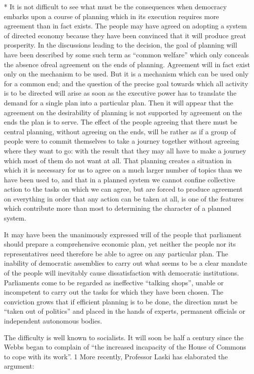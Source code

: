 \documentclass[11pt,openany]{book}
\begin{document}
* It is not difficult to see what must be the consequences when democracy embarks upon a course of planning which in its execution requires more agreement than in fact exists. The people may have agreed on adopting a system of directed economy because they have been convinced that it will produce great prosperity. In the discussions leading to the decision, the goal of planning will have been described by some such term as ``common welfare'' which only conceals the absence ofreal agreement on the ends of planning. Agreement will in fact exist only on the mechanism to be used. But it is a mechanism which can be used only for a common end; and the question of the precise goal towards which all activity is to be directed will arise as soon as the executive power has to translate the demand for a single plan into a particular plan. Then it will appear that the agreement on the desirability of planning is not supported by agreement on the ends the plan is to serve. The effect of the people agreeing that there must be central planning, without agreeing on the ends, will be rather as if a group of people were to commit themselves to take a journey together without agreeing where they want to go: with the result that they may all have to make a journey which most of them do not want at all. That planning creates a situation in which it is necessary for us to agree on a much larger number of topics than we have been used to, and that in a planned system we cannot confine collective action to the tasks on which we can agree, but are forced to produce agreement on everything in order that any action can be taken at all, is one of the features which contribute more than most to determining the character of a planned system.

It may have been the unanimously expressed will of the people that parliament should prepare a comprehensive economic plan, yet neither the people nor its representatives need therefore be able to agree on any particular plan. The inability of democratic assemblies to carry out what seems to be a clear mandate of the people will inevitably cause dissatisfaction with democratic institutions. Parliaments come to be regarded as ineffective ``talking shops'', unable or incompetent to carry out the tasks for which they have been chosen. The conviction grows that if efficient planning is to be done, the direction must be ``taken out of politics'' and placed in the hands of experts, permanent officials or independent autonomous bodies.

The difficulty is well known to socialists. It will soon be half a century since the Webbs began to complain of ``the increased incapacity of the House of Commons to cope with its work''. 1 More recently, Professor Laski has elaborated the argument:
\end{document}
